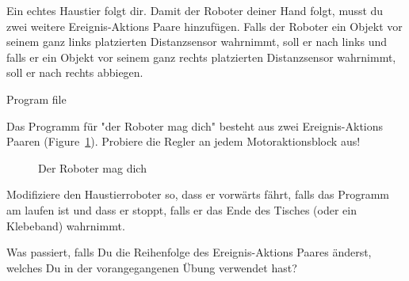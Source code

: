 
Ein echtes Haustier folgt dir.
Damit der Roboter deiner Hand folgt,
musst du zwei weitere Ereignis-Aktions Paare hinzufügen.
Falls der Roboter ein Objekt vor seinem
ganz links platzierten Distanzsensor wahrnimmt,
soll er nach links und falls er ein Objekt
vor seinem ganz rechts platzierten Distanzsensor wahrnimmt, soll er nach rechts abbiegen.

{\raggedleft \hfill Program file }

Das Programm für "der Roboter mag dich" besteht aus zwei Ereignis-Aktions Paaren
(Figure~\ref{fig.likes}).
Probiere die Regler an jedem Motoraktionsblock aus!

\begin{figure}
\begin{center}
\caption{Der Roboter mag dich}
\label{fig.likes}
\end{center}
\end{figure}


Modifiziere den Haustierroboter so,
dass er vorwärts fährt, falls das Programm am laufen ist
und dass er stoppt, falls er das Ende des Tisches (oder ein Klebeband) wahrnimmt.


Was passiert, falls Du die Reihenfolge des Ereignis-Aktions Paares änderst, 
welches Du in der vorangegangenen Übung verwendet hast?


